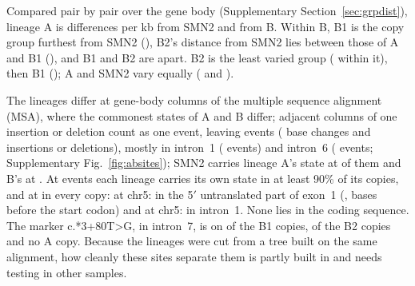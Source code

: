 \documentclass[10pt]{article}
\newcommand{\cpe}{c.*3+80T>G}
\begin{document}
Compared pair by pair over the gene body (Supplementary Section~\ref{sec:grpdist}), lineage A is \gdATwoMean{}
differences per kb from SMN2 and \gdABMean{} from B. Within B, B1 is the copy group furthest from SMN2
(\gsBoneTwo), B2's distance from SMN2 lies between those of A and B1 (\gsBtwoTwo), and B1 and B2 are \gsBoneBtwo{} apart. B2 is the least varied group
(\gsBtwoBtwo{} within it), then B1 (\gsBoneBone); A and SMN2 vary equally (\gsAA{} and \gdTwoTwoMean).

The lineages differ at \abCols{} gene-body columns of the multiple sequence alignment (MSA), where the commonest states of A and B differ; adjacent columns of one insertion or deletion count as one event, leaving
\abEvents{} events (\abSNV{} base changes and \abIndel{} insertions or deletions), mostly in intron~1 (\abIntronOne{} events) and
intron~6 (\abIntronSix{} events; Supplementary Fig.~\ref{fig:absites}); SMN2 carries lineage A's state at \abSmnTwoA{} of them and B's at \abSmnTwoB. At \abNearFixed{} events each lineage carries its own
state in at least 90\% of its copies, and at \abPerfect{} in every copy: \abPerfOneKind{} at chr5:\abPerfOnePos{} in
the 5$'$ untranslated part of exon~1 (\abPerfOneC, \abPerfOneBefore{} bases before the start codon) and \abPerfTwoKind{} at chr5:\abPerfTwoPos{} in intron~1. None
lies in the coding sequence. The marker \cpe{}, in intron~7, is on \linBoneMk{} of the \linBone{} B1 copies,
\linBtwoMk{} of the \linBtwo{} B2 copies and no A copy. Because the lineages were cut from a tree built on the same
alignment, how cleanly these sites separate them is partly built in and needs testing in other samples.
\end{document}
